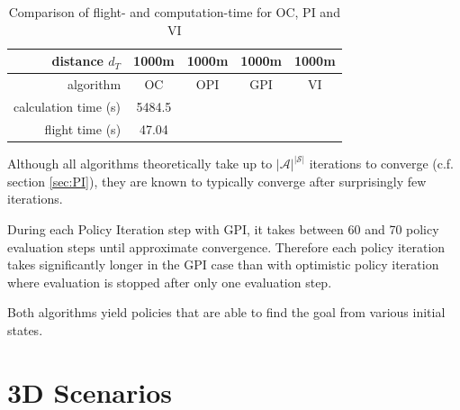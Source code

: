 \begin{table}[h]
	\begin{center}
		\begin{tabular}{r|c c c c}
			distance $d_T$ & 1000m & 1000m & 1000m & 1000m \\ \hline 
			algorithm & OC & OPI & GPI & VI \\
			calculation time (s) & 5484.5& & & \\
			flight time (s) & 47.04 & & &
		\end{tabular}
		\caption{Comparison of flight- and computation-time for OC, PI and VI}
		\label{tab:2d_flighttimes}
	\end{center}
\end{table}

Although all algorithms theoretically take up to $|\mathcal{A}|^{|\mathcal{S}|}$ iterations to converge (c.f. section \ref{sec:PI}), they are known to typically converge after surprisingly few iterations.

During each Policy Iteration step with GPI, it takes between 60 and 70 policy evaluation steps until approximate convergence. Therefore each policy iteration takes significantly longer in the GPI case than with optimistic policy iteration where evaluation is stopped after only one evaluation step.

Both algorithms yield policies that are able to find the goal from various initial states. 

\section{3D Scenarios}
\label{sec:results3d}